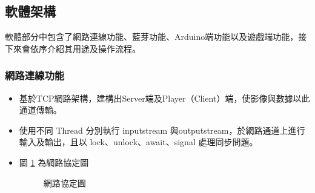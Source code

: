 \documentclass[12pt]{article}  %
\theoremstyle{plain}
\begin{document}
\subsection{軟體架構}
軟體部分中包含了網路連線功能、藍芽功能、Arduino端功能以及遊戲端功能，接下來會依序介紹其用途及操作流程。

\subsubsection{網路連線功能}
\begin{itemize}
\item 基於TCP網路架構，建構出Server端及Player（Client）端，使影像與數據以此通道傳輸。
\item 使用不同 Thread 分別執行 inputstream 與outputstream，於網路通道上進行輸入及輸出，且以 lock、unlock、await、signal 處理同步問題。
\item 圖 \ref{網路協定圖} 為網路協定圖
\begin{figure}[htbp]
\quad
{}
\quad
{}
\caption{網路協定圖} \label{網路協定圖}
\end{figure}
\newpage


\end{itemize}
\end{document}
